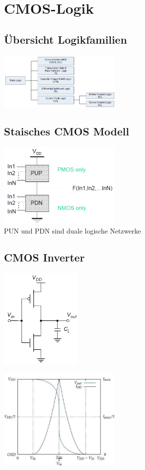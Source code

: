 \section{CMOS-Logik}
	\begin{multicols}{2}
		\subsection{\"Ubersicht Logikfamilien}
			\includegraphics[width=6cm]{bilder/cmosOverview.png}
		\subsection{Staisches CMOS Modell}
			\includegraphics[width=6cm]{bilder/cmosPrinzip.png}\\
			PUN und PDN sind duale logische Netzwerke\\
	\end{multicols}
	\subsection{CMOS Inverter}
		\begin{center}
			\begin{multicols}{2}
				\includegraphics[width=4cm]{bilder/cmosInverterSchema.png}\\
				\columnbreak
				
				\includegraphics[width=6cm]{bilder/cmosInverterSignal.png}\\
			\end{multicols}
		\end{center}
